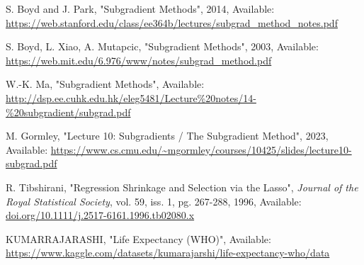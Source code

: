 \documentclass[12pt, letterpaper]{article}
\begin{document}
\begin{thebibliography}{9}

     S. Boyd and J. Park, "Subgradient Methods", 2014, Available: \url{https://web.stanford.edu/class/ee364b/lectures/subgrad_method_notes.pdf}

     S. Boyd, L. Xiao, A. Mutapcic, "Subgradient Methods", 2003, Available: \url{https://web.mit.edu/6.976/www/notes/subgrad_method.pdf}

     W.-K. Ma, "Subgradient Methods", Available: \url{http://dsp.ee.cuhk.edu.hk/eleg5481/Lecture%20notes/14-%20subgradient/subgrad.pdf}

     M. Gormley, "Lecture 10: Subgradients / The Subgradient Method", 2023, Available: \url{https://www.cs.cmu.edu/~mgormley/courses/10425/slides/lecture10-subgrad.pdf}

     R. Tibshirani, "Regression Shrinkage and Selection via the Lasso", \textit{Journal of the Royal Statistical Society}, vol. 59, iss. 1, pg. 267-288, 1996, Available: \url{doi.org/10.1111/j.2517-6161.1996.tb02080.x}

     KUMARRAJARASHI, "Life Expectancy (WHO)", Available: \url{https://www.kaggle.com/datasets/kumarajarshi/life-expectancy-who/data}


\end{thebibliography}
\end{document}
